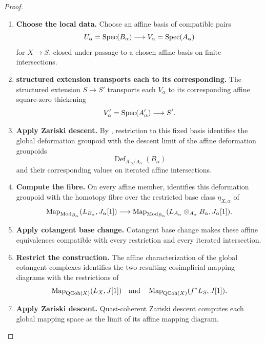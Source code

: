 \begin{proof}
\leavevmode
\begin{enumerate}[label=\textup{(\arabic*)}]
    \item \textbf{Choose the local data.}
    Choose an affine basis of compatible pairs
    \[
        U_\alpha=\operatorname{Spec}(B_\alpha)
        \longrightarrow
        V_\alpha=\operatorname{Spec}(A_\alpha)
    \]
    for \(X\to S\), closed under passage to a chosen affine basis on finite intersections.

    \item \textbf{structured extension transports each to its corresponding.}
    The structured extension \(S\to S'\) transports each \(V_\alpha\) to its corresponding affine
    square-zero thickening
    \[
        V'_\alpha=\operatorname{Spec}(A'_\alpha)\longrightarrow S'.
    \]

    \item \textbf{Apply Zariski descent.}
    By , restriction to this fixed basis identifies the
    global deformation groupoid with the descent limit of the affine deformation groupoids
    \[
        \operatorname{Def}_{A'_\alpha/A_\alpha}(B_\alpha)
    \]
    and their corresponding values on iterated affine intersections.

    \item \textbf{Compute the fibre.}
    On every affine member,  identifies this
    deformation groupoid with the homotopy fibre over the restricted base class \(\eta_{X,\alpha}\) of
    \[
        \operatorname{Map}_{\operatorname{Mod}_{B_\alpha}}
        (L_{B_\alpha},J_\alpha[1])
        \longrightarrow
        \operatorname{Map}_{\operatorname{Mod}_{B_\alpha}}
        (L_{A_\alpha}\otimes_{A_\alpha}B_\alpha,J_\alpha[1]).
    \]

    \item \textbf{Apply cotangent base change.}
    Cotangent base change makes these affine equivalences compatible with every restriction and
    every iterated intersection.

    \item \textbf{Restrict the construction.}
    The affine characterization of the global cotangent complexes identifies the two resulting
    cosimplicial mapping diagrams with the restrictions of
    \[
        \operatorname{Map}_{\operatorname{QCoh}(X)}(L_X,J[1])
        \quad\text{and}\quad
        \operatorname{Map}_{\operatorname{QCoh}(X)}(f^*L_S,J[1]).
    \]

    \item \textbf{Apply Zariski descent.}
    Quasi-coherent Zariski descent computes each global mapping space as the limit of its affine
    mapping diagram.


\end{enumerate}
\end{proof}

